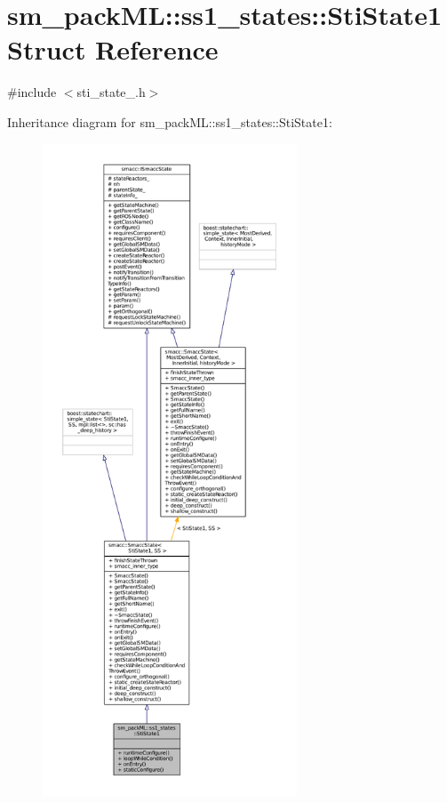 \hypertarget{structsm__packML_1_1ss1__states_1_1StiState1}{}\section{sm\+\_\+pack\+ML\+:\+:ss1\+\_\+states\+:\+:Sti\+State1 Struct Reference}
\label{structsm__packML_1_1ss1__states_1_1StiState1}


{\ttfamily \#include $<$sti\+\_\+state\+\_.\+h$>$}



Inheritance diagram for sm\+\_\+pack\+ML\+:\+:ss1\+\_\+states\+:\+:Sti\+State1\+:
\nopagebreak
\begin{figure}[H]
\begin{center}
\leavevmode
\includegraphics[height=550pt]{structsm__packML_1_1ss1__states_1_1StiState1__inherit__graph}
\end{center}
\end{figure}


